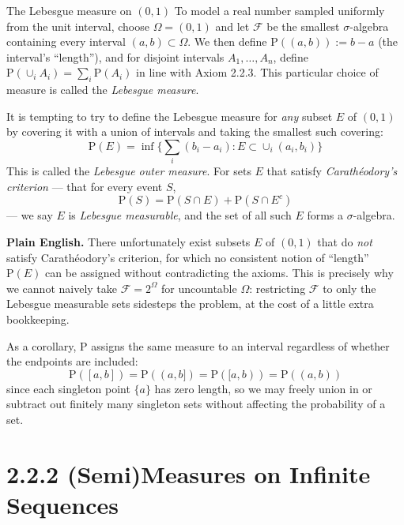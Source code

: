 \documentclass[aspectratio=169,10pt]{beamer}
\begin{document}
\begin{frame}[allowframebreaks]{The Lebesgue measure on $(0,1)$}
To model a real number sampled uniformly from the unit interval, choose
$\Omega=(0,1)$ and let $\mathcal{F}$ be the smallest $\sigma$-algebra
containing every interval $(a,b)\subset\Omega$. We then define
$\mathrm{P}((a,b)):=b-a$ (the interval's ``length''), and for disjoint
intervals $A_1,\ldots,A_n$, define $\mathrm{P}(\cup_i A_i)=\sum_i \mathrm{P}(A_i)$
in line with Axiom 2.2.3. This particular choice of measure is called the
\emph{Lebesgue measure}.

It is tempting to try to define the Lebesgue measure for \emph{any} subset
$E$ of $(0,1)$ by covering it with a union of intervals and taking the
smallest such covering:
\[ \mathrm{P}(E) = \inf\Big\{ \textstyle\sum_i (b_i-a_i) : E\subset \cup_i (a_i,b_i) \Big\} \]
This is called the \emph{Lebesgue outer measure}. For sets $E$ that satisfy
\emph{Carath\'{e}odory's criterion} --- that for every event $S$,
\[ \mathrm{P}(S) = \mathrm{P}(S\cap E)+\mathrm{P}(S\cap E^c) \]
--- we say $E$ is \emph{Lebesgue measurable}, and the set of all such $E$
forms a $\sigma$-algebra.

\textbf{Plain English.} There unfortunately exist subsets $E$ of $(0,1)$ that
do \emph{not} satisfy Carath\'{e}odory's criterion, for which no consistent
notion of ``length'' $\mathrm{P}(E)$ can be assigned without contradicting the
axioms. This is precisely why we cannot naively take $\mathcal{F}=2^{\Omega}$
for uncountable $\Omega$: restricting $\mathcal{F}$ to only the Lebesgue
measurable sets sidesteps the problem, at the cost of a little extra
bookkeeping.

As a corollary, $\mathrm{P}$ assigns the same measure to an interval
regardless of whether the endpoints are included:
\[ \mathrm{P}([a,b]) = \mathrm{P}((a,b]) = \mathrm{P}([a,b)) = \mathrm{P}((a,b)) \]
since each singleton point $\{a\}$ has zero length, so we may freely union in
or subtract out finitely many singleton sets without affecting the
probability of a set.
\end{frame}

\section{2.2.2 (Semi)Measures on Infinite Sequences}
\end{document}
